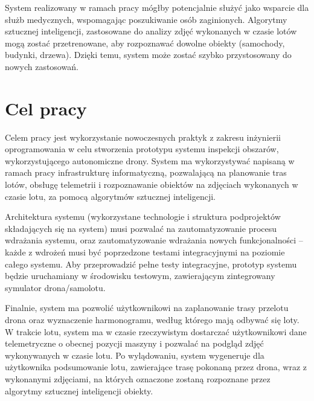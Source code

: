 System realizowany w ramach pracy mógłby potencjalnie służyć jako wsparcie dla służb
medycznych, wspomagając poszukiwanie osób zaginionych. Algorytmy sztucznej inteligencji,
zastosowane do analizy zdjęć wykonanych w czasie lotów mogą zostać przetrenowane, aby 
rozpoznawać dowolne obiekty (samochody, budynki, drzewa). Dzięki temu, system może zostać
szybko przystosowany do nowych zastosowań.
  


\newpage
\section{Cel pracy} \label{intro_objective}

Celem pracy jest wykorzystanie nowoczesnych praktyk z zakresu inżynierii 
oprogramowania w celu stworzenia prototypu systemu inspekcji obszarów,
wykorzystującego autonomiczne drony. System ma wykorzystywać napisaną w ramach pracy
infrastrukturę informatyczną, pozwalającą na planowanie tras lotów, obsługę telemetrii
i rozpoznawanie obiektów na zdjęciach wykonanych w czasie lotu, za pomocą algorytmów
sztucznej inteligencji. 

Architektura systemu (wykorzystane technologie i struktura podprojektów składających
się na system) musi pozwalać na zautomatyzowanie procesu wdrażania
systemu, oraz zautomatyzowanie wdrażania nowych funkcjonalności -- każde
z wdrożeń musi być poprzedzone testami integracyjnymi na poziomie całego systemu.
Aby przeprowadzić pełne testy integracyjne, prototyp systemu będzie uruchamiany
w środowisku testowym, zawierającym zintegrowany symulator drona/samolotu.

Finalnie, system ma pozwolić użytkownikowi na zaplanowanie trasy przelotu drona
oraz wyznaczenie harmonogramu, według którego mają odbywać się loty. W trakcie 
lotu, system ma w czasie rzeczywistym dostarczać użytkownikowi dane telemetryczne
o obecnej pozycji maszyny i pozwalać na podgląd zdjęć wykonywanych w czasie lotu.
Po wylądowaniu, system wygeneruje dla użytkownika podsumowanie lotu, zawierające
trasę pokonaną przez drona, wraz z wykonanymi zdjęciami, na których oznaczone zostaną
rozpoznane przez algorytmy sztucznej inteligencji obiekty.

